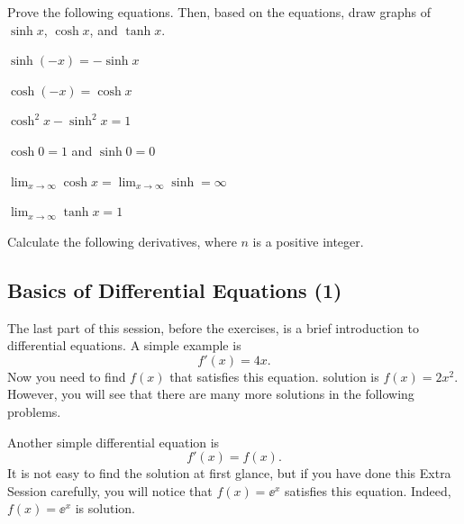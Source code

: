 \documentclass[11pt,pdfa,lastpage]{MishoNote}
\begin{document}
\ornamentskip

\begin{enumerate}[resume]
  \itemA Prove the following equations. Then, based on the equations, draw graphs of $\sinh x$, $\cosh x$, and $\tanh x$.
  \begin{menumerate}{2}
    \item $\sinh(-x)=-\sinh x$
    \item $\cosh(-x)=\cosh x$
    \item $\cosh^2x-\sinh^2x=1$
    \item $\cosh 0=1$ and $\sinh 0=0$
    \item $\displaystyle\lim_{x\to\infty}\cosh x=\lim_{x\to\infty}\sinh=\infty$
    \item $\displaystyle\lim_{x\to\infty}\tanh x=1$
  \end{menumerate}
  \itemC Calculate the following derivatives, where $n$ is a positive integer.
  \begin{menumerate}{3}
\end{menumerate}
\end{enumerate}

\newpage

\subsection{Basics of Differential Equations (1)}
The last part of this session, before the exercises, is a brief introduction to differential equations.
A simple example is
\[ f'(x)=4x. \]
Now you need to find $f(x)$ that satisfies this equation.
 solution is $f(x)=2x^2$. However, you will see that there are many more solutions in the following problems.

Another simple differential equation is
\[ f'(x) = f(x). \]
It is not easy to find the solution at first glance, but if you have done this Extra Session carefully, you will notice that $f(x)=\ee^x$ satisfies this equation. Indeed, $f(x)=\ee^x$ is  solution.

\ornamentskip
\end{document}
